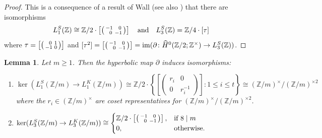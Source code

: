 \documentclass[11pt,a4paper,leqno]{amsart}
\newtheorem{lemma}[theorem]{Lemma}
\theoremstyle{definition}
\theoremstyle{remark}
\newenvironment{clist}[1]
{\begin{enumerate}[\normalfont #1]}
{\end{enumerate}}
\newcommand{\wh}{\widehat}
\newcommand{\cy}[1]{\Z/{#1}}
\newcommand{\Z}{\mathbb{Z}}
\DeclareMathOperator{\IM}{im}
\newcommand{\bd}{\partial}
\newcommand{\sx}{\hphantom{x}}
\begin{document}
\begin{proof}
This is a consequence of a result of Wall \cite[Proposition 1.4.1]{Wall:1976} (see also \cite[Proposition III.10 (I)]{Kreck:1984}) that there are isomorphisms
\[ L_1^S(\Z) \cong \Z/2 \cdot \left[ \left(\begin{smallmatrix} -1 &\sx 0 \\ \sx 0 & -1 \end{smallmatrix}\right) \right]\quad \text{and} \quad L_3^S(\Z) = \cy 4 \cdot [\tau]\]
where $\tau = \left[ \left(\begin{smallmatrix} \sx 0 & 1 \\ -1 & 0 \end{smallmatrix}\right) \right ]$ and $[\tau^2] =   \left [\left(\begin{smallmatrix} -1 & \sx 0 \\ \sx 0 & -1 \end{smallmatrix}\right)\right ] =
 \IM(\bd \colon \wh H^0(\cy 2;\Z^\times) \to L_3^S(\Z))$.
\end{proof}

\begin{lemma} \label{lemma:L_1(Z/m)}
Let $m \ge 1$. Then the hyperbolic map $\bd$ induces isomorphisms:
\begin{clist}{(i)}
\item $\ker(L_1^S(\Z/m) \to L_1^K(\Z/m)) \cong \Z/2\cdot \left\{ \left[ \left(\begin{smallmatrix} r_i & 0 \\ 0 & r_i^{-1} \end{smallmatrix}\right) \right] : 1 \le i \le t \right\} \cong  (\Z/m)^\times/(\cy m)^{\times 2}$
where the $r_i \in (\Z/m)^\times$ are coset representatives for $(\Z/m)^\times/(\cy m)^{\times 2}$.
\item $\ker(L_3^S(\Z/m) \to L_3^K(\Z/m)) \cong 
\begin{cases} \Z/2 \cdot \left[ \left(\begin{smallmatrix} -1 &\sx 0 \\ \sx 0 & -1 \end{smallmatrix}\right) \right], & \text{if $8 \mid m$} \\
0, & \text{otherwise}. \end{cases}$
\end{clist}
\end{lemma}
\end{document}
